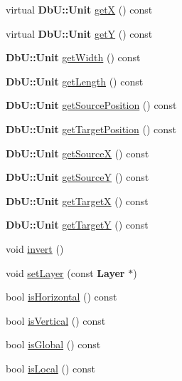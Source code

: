 \begin{DoxyCompactItemize}
\item 
virtual {\bf Db\-U\-::\-Unit} \hyperlink{classKatabatic_1_1AutoSegment_a852afe759ce2cb8cb9c0524fc1e23387}{get\-X} () const 
\item 
virtual {\bf Db\-U\-::\-Unit} \hyperlink{classKatabatic_1_1AutoSegment_ac597d25a34a79fb4393211c70f5a1bc3}{get\-Y} () const 
\item 
{\bf Db\-U\-::\-Unit} \hyperlink{classKatabatic_1_1AutoSegment_aa018d3e74791b77d2def527248b9b00a}{get\-Width} () const 
\item 
{\bf Db\-U\-::\-Unit} \hyperlink{classKatabatic_1_1AutoSegment_a5370f2cf21823e1fa58d0627ee53c483}{get\-Length} () const 
\item 
{\bf Db\-U\-::\-Unit} \hyperlink{classKatabatic_1_1AutoSegment_a60c1e9c6cda9445e409e00ff22b1f52c}{get\-Source\-Position} () const 
\item 
{\bf Db\-U\-::\-Unit} \hyperlink{classKatabatic_1_1AutoSegment_a2b6bdf8fa83a7ce4cafa61314bee4e43}{get\-Target\-Position} () const 
\item 
{\bf Db\-U\-::\-Unit} \hyperlink{classKatabatic_1_1AutoSegment_ab160396298a1a51b9988ad246dc2a47f}{get\-Source\-X} () const 
\item 
{\bf Db\-U\-::\-Unit} \hyperlink{classKatabatic_1_1AutoSegment_a232af840ba84faa0b1411ba1c3a418f1}{get\-Source\-Y} () const 
\item 
{\bf Db\-U\-::\-Unit} \hyperlink{classKatabatic_1_1AutoSegment_ae80b70bf8e29a74d8a5f61d1257c6cf2}{get\-Target\-X} () const 
\item 
{\bf Db\-U\-::\-Unit} \hyperlink{classKatabatic_1_1AutoSegment_a0917c7f78a251822ea0ac6f48298d1c5}{get\-Target\-Y} () const 
\item 
void \hyperlink{classKatabatic_1_1AutoSegment_acbac6289ab14574da20f26c933e2e741}{invert} ()
\item 
void \hyperlink{classKatabatic_1_1AutoSegment_aad4271c35e0162c8a4d034dca07f5a4b}{set\-Layer} (const {\bf Layer} $\ast$)
\item 
bool \hyperlink{classKatabatic_1_1AutoSegment_ac46ac3b48d712750c7888b48964ac189}{is\-Horizontal} () const 
\item 
bool \hyperlink{classKatabatic_1_1AutoSegment_a2bb30e82aad1f321af4a065338775f36}{is\-Vertical} () const 
\item 
bool \hyperlink{classKatabatic_1_1AutoSegment_a017b1ead8e5988dd0e491cae93ac510c}{is\-Global} () const 
\item 
bool \hyperlink{classKatabatic_1_1AutoSegment_a69fb7e260ed2bc6fa82bfe12c2aeec5a}{is\-Local} () const 

\end{DoxyCompactItemize}
